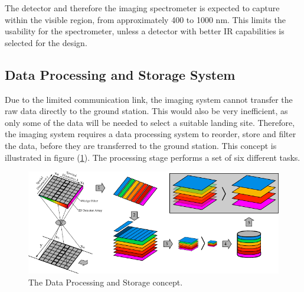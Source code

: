 The detector and therefore the imaging spectrometer is expected to capture within the visible region, from approximately 400 to 1000 nm. This limits the usability for the spectrometer, unless a detector with better IR capabilities is selected for the design.
\subsection{Data Processing and Storage System}
Due to the limited communication link, the imaging system cannot transfer the raw data directly to the ground station. This would also be very inefficient, as only some of the data will be needed to select a suitable landing site. Therefore, the imaging system requires a data processing system to reorder, store and filter the data, before they are transferred to the ground station. This concept is illustrated in figure (\ref{fig:dat_process_concept}). The processing stage performs a set of six different tasks.
\begin{figure}[htb]
\centering
\includegraphics[width=\textwidth]{figures/Orbiter/data_processing_system.pdf}
\caption{The Data Processing and Storage concept.}
\label{fig:dat_process_concept}
\end{figure}
